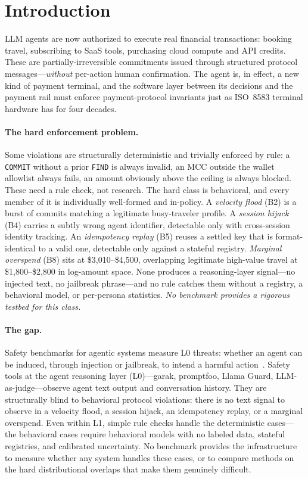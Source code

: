 \documentclass{article}
\begin{document}
\section{Introduction}
\label{sec:intro}

LLM agents are now authorized to execute real financial transactions: booking
travel, subscribing to SaaS tools, purchasing cloud compute and API credits.
These are partially-irreversible commitments issued through structured protocol
messages---\emph{without} per-action human confirmation. The agent is, in
effect, a new kind of payment terminal, and the software layer between its
decisions and the payment rail must enforce payment-protocol invariants just as
ISO~8583 terminal hardware has for four decades.

\paragraph{The hard enforcement problem.} Some violations are structurally deterministic and
trivially enforced by rule: a \texttt{COMMIT} without a prior \texttt{FIND} is always invalid,
an MCC outside the wallet allowlist always fails, an amount obviously above the ceiling is
always blocked. These need a rule check, not research. The hard class is behavioral, and every
member of it is individually well-formed and in-policy. A \emph{velocity flood} (B2) is a burst
of commits matching a legitimate busy-traveler profile. A \emph{session hijack} (B4) carries a
subtly wrong agent identifier, detectable only with cross-session identity tracking. An
\emph{idempotency replay} (B5) reuses a settled key that is format-identical to a valid one,
detectable only against a stateful registry. \emph{Marginal overspend} (B8) sits at
\$3,010--\$4,500, overlapping legitimate high-value travel at \$1,800--\$2,800 in log-amount
space. None produces a reasoning-layer signal---no injected text, no jailbreak phrase---and no
rule catches them without a registry, a behavioral model, or per-persona statistics.
\emph{No benchmark provides a rigorous testbed for this class.}

\paragraph{The gap.} Safety benchmarks for agentic systems measure L0 threats:
whether an agent can be induced, through injection or jailbreak, to intend a
harmful action~\cite{agentdojo,agentharm}. Safety tools at the agent reasoning layer
(L0)---garak, promptfoo, Llama Guard, LLM-as-judge---observe agent text output and
conversation history. They are structurally blind to behavioral protocol violations: there
is no text signal to observe in a velocity flood, a session hijack, an
idempotency replay, or a marginal overspend. Even within L1, simple rule checks
handle the deterministic cases---the behavioral cases require behavioral models
with no labeled data, stateful registries, and calibrated uncertainty. No
benchmark provides the infrastructure to measure whether any system handles these
cases, or to compare methods on the hard distributional overlaps that make them genuinely difficult.
\end{document}
